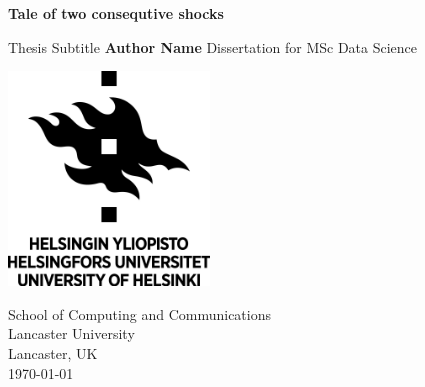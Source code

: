 \begin{titlepage}
\begin{center}
\vspace*{5cm}
\Huge{\textbf{Tale of two consequtive shocks}}

\vspace*{3cm}
\Large{Thesis Subtitle}
\vfill
\Large{\textbf{Author Name}}
\vfill
Dissertation for MSc Data Science

\vspace{0.8cm}
\includegraphics[width=0.4\textwidth]{university.png}

School of Computing and Communications\\
Lancaster University\\
Lancaster, UK\\
\today
\end{center}
\end{titlepage}


\thispagestyle{empty}

% 
% 

\setcounter{page}{1}
